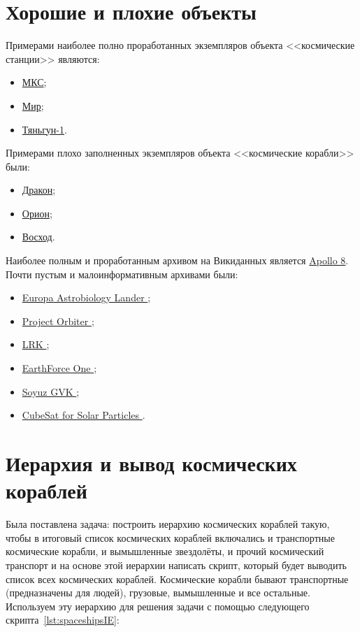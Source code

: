 \section{Хорошие и плохие объекты}
Примерами наиболее полно проработанных экземпляров объекта <<космические станции>> являются:
\begin{itemize}
  \item\href{https://www.wikidata.org/wiki/Q25271}{МКС};
  \item\href{https://www.wikidata.org/wiki/Q48604}{Мир};
  \item\href{https://www.wikidata.org/wiki/Q131500}{Тяньгун-1}.
\end{itemize}
Примерами плохо заполненных экземпляров объекта <<космические корабли>> были:
\begin{itemize}
  \item\href{https://www.wikidata.org/wiki/Q236448}{Дракон};
  \item\href{https://www.wikidata.org/wiki/Q211727}{Орион};
  \item\href{https://www.wikidata.org/wiki/Q841176}{Восход}.
\end{itemize}
Наиболее полным и проработанным архивом на Викиданных является \href{ https://www.wikidata.org/wiki/Q184201}{Apollo 8}.
Почти пустым и малоинформативным архивами были: 
\begin{itemize}
  \item\href{https://www.wikidata.org/wiki/Q10491365}{ Europa Astrobiology Lander };
  \item\href{https://www.wikidata.org/wiki/Q6514453 }{ Project Orbiter };
  \item\href{https://www.wikidata.org/wiki/Q5961734 }{ LRK };
  \item\href{https://www.wikidata.org/wiki/Q5327028 }{ EarthForce One };
  \item\href{https://www.wikidata.org/wiki/Q60767924 }{ Soyuz GVK };
  \item\href{https://www.wikidata.org/wiki/Q22907583 }{ CubeSat for Solar Particles }.
\end{itemize}

\section{Иерархия и вывод космических кораблей}
Была поставлена задача: построить иерархию космических кораблей такую, чтобы в итоговый список космических кораблей включались и транспортные космические корабли, и вымышленные звездолёты, и прочий космический транспорт и на основе этой иерархии написать скрипт, который будет выводить список всех космических кораблей. Космические корабли бывают транспортные (предназначены для людей), грузовые, вымышленные и все остальные. Используем эту иерархию для решения задачи с помощью следующего скрипта~\ref{lst:spaceshipsIE}:


